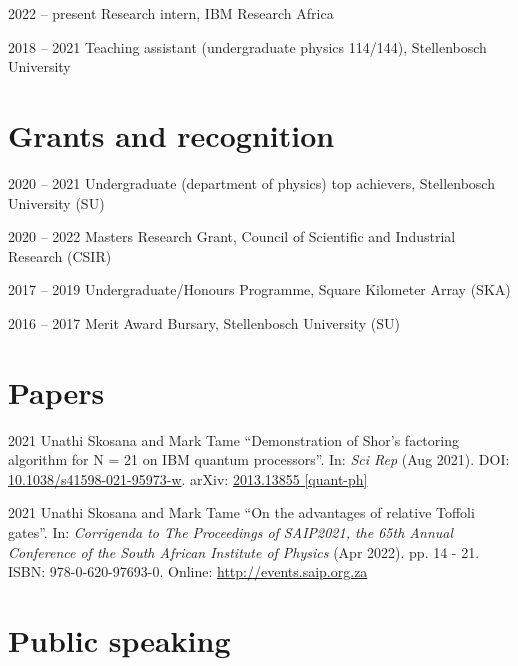 \documentclass[10pt]{extreport}
\begin{document}
\begin{tablist}
	\item[2022 -- present]  \tab{} Research intern, IBM Research Africa
	\item[2018 -- 2021] \tab{} Teaching assistant (undergraduate physics 114/144), Stellenbosch University
\end{tablist}

\section*{Grants and recognition}

\begin{tablist}
	\item[2020 -- 2021] \tab{} Undergraduate (department of physics) top achievers, Stellenbosch University (SU)
	\item[2020 -- 2022]  \tab{} Masters Research Grant, Council of Scientific and Industrial Research (CSIR)
	\item[2017 -- 2019]  \tab{} Undergraduate/Honours Programme, Square Kilometer Array (SKA)
	\item[2016 -- 2017]  \tab{} Merit Award Bursary, Stellenbosch University (SU)
\end{tablist}

\section*{Papers}

\begin{tablist}
	\item[2021] \tab{}Unathi Skosana and Mark Tame \enquote{Demonstration of Shor’s factoring algorithm for N = 21 on IBM quantum processors}. In: \textit{Sci Rep} (Aug 2021). DOI: \href{https://doi.org/10.1038/s41598-021-95973-w}{10.1038/s41598-021-95973-w}. arXiv: \href{https://arxiv.org/abs/2103.13855}{2013.13855 [quant-ph]}
	\item[2021] \tab{}Unathi Skosana and Mark Tame \enquote{On the advantages of relative
		Toffoli gates}. In: \textit{Corrigenda to The Proceedings of SAIP2021, the 65th  Annual Conference of
		the South African Institute of Physics} (Apr 2022). pp. 14 - 21. ISBN:
	978-0-620-97693-0. Online: \url{http://events.saip.org.za}

\end{tablist}

\section*{Public speaking}
\end{document}
